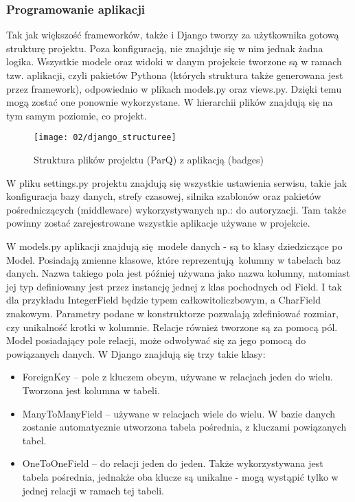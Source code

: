 \subsubsection*{Programowanie aplikacji}
Tak jak większość frameworków, także i Django tworzy za użytkownika gotową strukturę projektu. Poza konfiguracją, nie znajduje się w nim jednak żadna logika. Wszystkie modele oraz widoki w danym projekcie tworzone są w ramach tzw. aplikacji, czyli pakietów Pythona (których struktura także generowana jest przez framework), odpowiednio w plikach models.py oraz views.py. Dzięki temu mogą zostać one ponownie wykorzystane. W hierarchii plików znajdują się na tym samym poziomie, co projekt. 
\begin{figure}[h]
	\begin{center}
		\texttt{[image: 02/django\_structuree]}
	\end{center}
	\caption{Struktura plików projektu (ParQ) z aplikacją (badges)}
	\vspace{-0.3cm}
\end{figure}

W pliku settings.py projektu znajdują się wszystkie ustawienia serwisu, takie jak konfiguracja bazy danych, strefy czasowej, silnika szablonów oraz pakietów pośredniczących (middleware) wykorzystywanych np.: do autoryzacji. Tam także powinny zostać zarejestrowane wszystkie aplikacje używane w projekcie.

W models.py aplikacji znajdują się modele danych - są to klasy dziedziczące po Model. Posiadają zmienne klasowe, które reprezentują kolumny w tabelach baz danych. Nazwa takiego pola jest później używana jako nazwa kolumny, natomiast jej typ definiowany jest przez instancję jednej z klas pochodnych od Field. I tak dla przykładu IntegerField będzie typem całkowitoliczbowym, a CharField znakowym. Parametry podane w konstruktorze pozwalają zdefiniować rozmiar, czy unikalność krotki w kolumnie. Relacje również tworzone są za pomocą pól. Model posiadający pole relacji, może odwoływać się za jego pomocą do powiązanych danych. W Django znajdują się trzy takie klasy:
\begin{itemize}
	\item ForeignKey -- pole z kluczem obcym, używane w relacjach jeden do wielu. Tworzona jest kolumna w tabeli.
	\item ManyToManyField -- używane w relacjach wiele do wielu. W bazie danych zostanie automatycznie utworzona tabela pośrednia, z kluczami powiązanych tabel.
	\item OneToOneField -- do relacji jeden do jeden. Także wykorzystywana jest tabela pośrednia, jednakże oba klucze są unikalne - mogą wystąpić tylko w jednej relacji w ramach tej tabeli.
\end{itemize}

